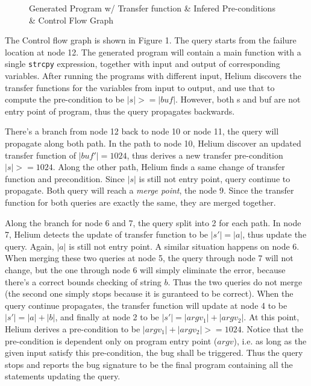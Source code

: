 \begin{figure*}
  \caption{Generated Program w/ Transfer function \& Infered
    Pre-conditions \& Control Flow Graph}
\end{figure*}

The Control flow graph is shown in Figure 1. The query starts from the
failure location at node 12. The generated program will contain a main
function with a single \texttt{strcpy} expression, together with input
and output of corresponding variables. After running the programs with
different input, Helium discovers the transfer functions for the
variables from input to output, and use that to compute the
pre-condition to be $|s| >= |buf|$. However, both s and buf are not
entry point of program, thus the query propagates backwards.

There's a branch from node 12 back to node 10 or node 11, the query
will propagate along both path. In the path to node 10, Helium
discover an updated transfer function of $|buf'|=1024$, thus derives a
new transfer pre-condition $|s|>=1024$. Along the other path, Helium
finds a same change of transfer function and precondition. Since $|s|$
is still not entry point, query continue to propagate.  Both query
will reach a \textit{merge point}, the node 9. Since the transfer
function for both queries are exactly the same, they are merged
together.

Along the branch for node 6 and 7, the query split into 2 for each
path. In node 7, Helium detects the update of transfer function to be
$|s'|=|a|$, thus update the query. Again, $|a|$ is still not entry
point. A similar situation happens on node 6. When merging these two
queries at node 5, the query through node 7 will not change, but the
one through node 6 will simply eliminate the error, because there's a
correct bounds checking of string $b$. Thus the two queries do not
merge (the second one simply stops because it is guranteed to be
correct). When the query continue propagates, the transfer function
will update at node 4 to be $|s'|=|a|+|b|$, and finally at node 2 to
be $|s'|=|argv_1|+|argv_2|$. At this point, Helium derives a
pre-condition to be $|argv_1|+|argv_2|>=1024$. Notice that the
pre-condition is dependent only on program entry point ($argv$),
i.e. as long as the given input satisfy this pre-condition, the bug
shall be triggered. Thus the query stops and reports the bug signature
to be the final program containing all the statements updating the
query.


